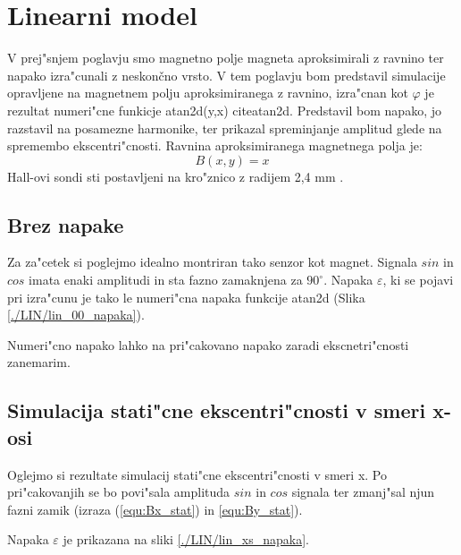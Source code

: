 \chapter{Linearni model}

V prej"snjem poglavju smo magnetno polje magneta aproksimirali z ravnino ter napako izra"cunali z neskončno vrsto. V tem poglavju bom predstavil simulacije opravljene na magnetnem polju aproksimiranega z ravnino, izra"cnan kot $\varphi$ je rezultat numeri"cne funkicje atan2d(y,x) citeatan2d. Predstavil bom napako, jo razstavil na posamezne harmonike, ter prikazal spreminjanje amplitud glede na spremembo ekscentri"cnosti. Ravnina aproksimiranega magnetnega polja je: 
\begin{equation}
\label{equ:lin_polje}
B(x,y)= x
\end{equation}
Hall-ovi sondi sti postavljeni na kro"znico z radijem 2,4 mm \cite{AM8192}.


\section{Brez napake}

Za za"cetek si poglejmo idealno montriran tako senzor kot magnet. Signala $sin$ in $cos$ imata enaki amplitudi in sta fazno zamaknjena za $90^{\circ}$. Napaka $\varepsilon$, ki se pojavi pri izra"cunu je tako le numeri"cna napaka funkcije atan2d (Slika \ref{./LIN/lin_00_napaka}).

Numeri"cno napako lahko na pri"cakovano napako zaradi ekscnetri"cnosti zanemarim.


\newpage
\section{Simulacija stati"cne ekscentri"cnosti v smeri x-osi}

Oglejmo si rezultate simulacij stati"cne ekscentri"cnosti v smeri x. Po pri"cakovanjih se bo povi"sala amplituda $sin$ in $cos$ signala ter zmanj"sal njun fazni zamik (izraza (\ref{equ:Bx_stat}) in \ref{equ:By_stat}).
 
\newpage


Napaka $\varepsilon$  je prikazana na sliki \ref{./LIN/lin_xs_napaka}.

